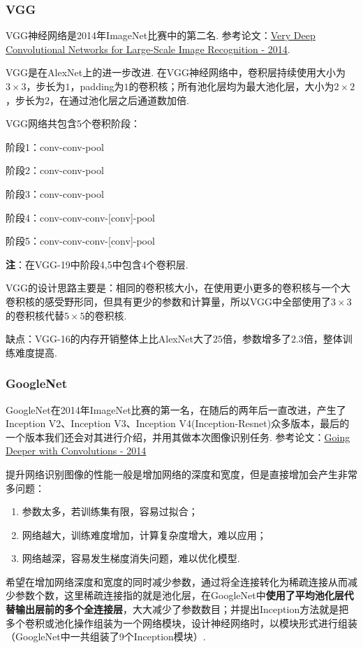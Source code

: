 \documentclass[12pt, a4paper, oneside]{ctexart}
\numberwithin{equation}{section}  %
\begin{document}
\subsubsection{VGG}
VGG神经网络是2014年ImageNet比赛中的第二名. 参考论文：\href{https://arxiv.org/pdf/1409.1556.pdf}{Very Deep Convolutional Networks for Large-Scale Image Recognition - 2014}.

VGG是在AlexNet上的进一步改进. 在VGG神经网络中，卷积层持续使用大小为$3\times 3$，步长为$1$，padding为$1$的卷积核；所有池化层均为最大池化层，大小为$2\times 2$，步长为$2$，在通过池化层之后通道数加倍.


VGG网络共包含5个卷积阶段：

阶段1：conv-conv-pool

阶段2：conv-conv-pool

阶段3：conv-conv-pool

阶段4：conv-conv-conv-[conv]-pool

阶段5：conv-conv-conv-[conv]-pool

\textbf{注}：在VGG-19中阶段4,5中包含4个卷积层.

VGG的设计思路主要是：相同的卷积核大小，在使用更小更多的卷积核与一个大卷积核的感受野形同，但具有更少的参数和计算量，所以VGG中全部使用了$3\times 3$的卷积核代替$5\times 5$的卷积核.

缺点：VGG-16的内存开销整体上比AlexNet大了$25$倍，参数增多了$2.3$倍，整体训练难度提高.

\subsubsection{GoogleNet}
GoogleNet在2014年ImageNet比赛的第一名，在随后的两年后一直改进，产生了Inception V2、Inception V3、Inception V4(Inception-Resnet)众多版本，最后的一个版本我们还会对其进行介绍，并用其做本次图像识别任务. 参考论文：\href{https://arxiv.org/abs/1409.4842}{Going Deeper with Convolutions - 2014}

提升网络识别图像的性能一般是增加网络的深度和宽度，但是直接增加会产生非常多问题：

\begin{enumerate}
  \item 参数太多，若训练集有限，容易过拟合；
  \item 网络越大，训练难度增加，计算复杂度增大，难以应用；
  \item 网络越深，容易发生梯度消失问题，难以优化模型.
\end{enumerate}

希望在增加网络深度和宽度的同时减少参数，通过将全连接转化为稀疏连接从而减少参数个数，这里稀疏连接指的就是池化层，在GoogleNet中\textbf{使用了平均池化层代替输出层前的多个全连接层}，大大减少了参数数目；并提出Inception方法就是把多个卷积或池化操作组装为一个网络模块，设计神经网络时，以模块形式进行组装（GoogleNet中一共组装了9个Inception模块）.
\end{document}
